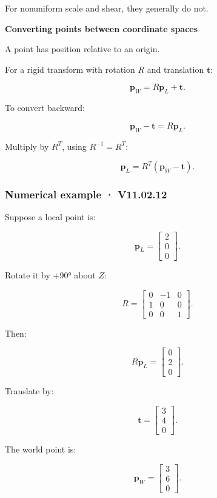 For nonuniform scale and shear, they generally do not.

\textbf{Converting points between coordinate spaces}

A point has position relative to an origin.

For a rigid transform with rotation \(R\) and translation \(\mathbf t\):

\[
 \boxed{ \mathbf p_W=R\mathbf p_L+\mathbf t }.
\]

To convert backward:

\[
 \mathbf p_W-\mathbf t=R\mathbf p_L.
\]

Multiply by \(R^T\), using \(R^{-1}=R^T\):

\[
 \boxed{ \mathbf p_L=R^T(\mathbf p_W-\mathbf t) }.
\]

\subsubsection{Numerical example · V11.02.12}\label{numerical-example-v11.02.12}

Suppose a local point is:

\[
 \mathbf p_L= \begin{bmatrix}2\\0\\0\end{bmatrix}.
\]

Rotate it by +90° about \(Z\):

\[
 R= \begin{bmatrix} 0&-1&0\\ 1&0&0\\ 0&0&1 \end{bmatrix}.
\]

Then:

\[
 R\mathbf p_L= \begin{bmatrix}0\\2\\0\end{bmatrix}.
\]

Translate by:

\[
 \mathbf t= \begin{bmatrix}3\\4\\0\end{bmatrix}.
\]

The world point is:

\[
 \boxed{ \mathbf p_W= \begin{bmatrix}3\\6\\0\end{bmatrix} }.
\]

